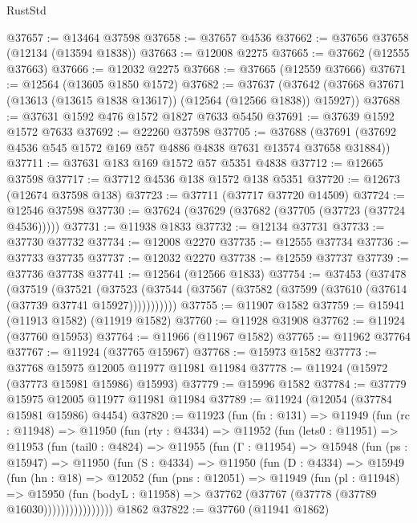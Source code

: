 \begin{lexlean}{RustStd}
\begin{coremodule}
@37657 := @13464 @37598
@37658 := @37657 @4536
@37662 := @37656 @37658 (@12134 (@13594 @1838))
@37663 := @12008 @2275
@37665 := @37662 (@12555 @37663)
@37666 := @12032 @2275
@37668 := @37665 (@12559 @37666)
@37671 := @12564 (@13605 @1850 @1572)
@37682 := @37637
    (@37642 (@37668 @37671 (@13613 (@13615 @1838 @13617)) (@12564 (@12566 @1838)) @15927))
@37688 := @37631 @1592 @476 @1572 @1827 @7633 @5450
@37691 := @37639 @1592 @1572 @7633
@37692 := @22260 @37598
@37705 := @37688 (@37691 (@37692 @4536 @545 @1572 @169 @57 @4886 @4838 @7631 @13574 @37658 @31884))
@37711 := @37631 @183 @169 @1572 @57 @5351 @4838
@37712 := @12665 @37598
@37717 := @37712 @4536 @138 @1572 @138 @5351
@37720 := @12673 (@12674 @37598 @138)
@37723 := @37711 (@37717 @37720 @14509)
@37724 := @12546 @37598
@37730 := @37624 (@37629 (@37682 (@37705 (@37723 (@37724 @4536)))))
@37731 := @11938 @1833
@37732 := @12134 @37731
@37733 := @37730 @37732
@37734 := @12008 @2270
@37735 := @12555 @37734
@37736 := @37733 @37735
@37737 := @12032 @2270
@37738 := @12559 @37737
@37739 := @37736 @37738
@37741 := @12564 (@12566 @1833)
@37754 := @37453
    (@37478
      (@37519
        (@37521
          (@37523 (@37544 (@37567 (@37582 (@37599 (@37610 (@37614 (@37739 @37741 @15927)))))))))))
@37755 := @11907 @1582
@37759 := @15941 (@11913 @1582) (@11919 @1582)
@37760 := @11928 @31908
@37762 := @11924 (@37760 @15953)
@37764 := @11966 (@11967 @1582)
@37765 := @11962 @37764
@37767 := @11924 (@37765 @15967)
@37768 := @15973 @1582
@37773 := @37768 @15975 @12005 @11977 @11981 @11984
@37778 := @11924 (@15972 (@37773 @15981 @15986) @15993)
@37779 := @15996 @1582
@37784 := @37779 @15975 @12005 @11977 @11981 @11984
@37789 := @11924 (@12054 (@37784 @15981 @15986) @4454)
@37820 := @11923
    (fun (fn : @131) =>
    @11949
      (fun (rc : @11948) =>
      @11950
        (fun (rty : @4334) =>
        @11952
          (fun (lets0 : @11951) =>
          @11953
            (fun (tail0 : @4824) =>
            @11955
              (fun (Γ : @11954) =>
              @15948
                (fun (ps : @15947) =>
                @11950
                  (fun (S : @4334) =>
                  @11950
                    (fun (D : @4334) =>
                    @15949
                      (fun (hn : @18) =>
                      @12052
                        (fun (pns : @12051) =>
                        @11949
                          (fun (pl : @11948) =>
                          @15950
                            (fun (bodyL : @11958) =>
                            @37762 (@37767 (@37778 (@37789 @16030))))))))))))))))
    @1862
@37822 := @37760 (@11941 @1862)

\end{coremodule}
\end{lexlean}
